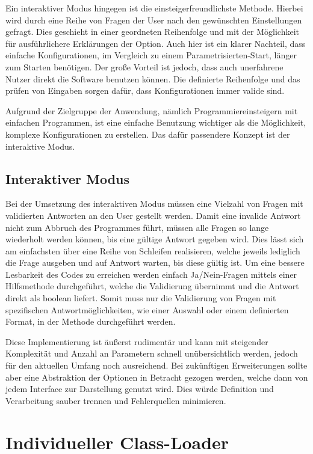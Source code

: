 Ein interaktiver Modus hingegen ist die einsteigerfreundlichste Methode. Hierbei wird durch eine Reihe von Fragen der User nach den gewünschten Einstellungen gefragt. Dies geschieht in einer geordneten Reihenfolge und mit der Möglichkeit für ausführlichere Erklärungen der Option. Auch hier ist ein klarer Nachteil, dass einfache Konfigurationen, im Vergleich zu einem Parametrisierten-Start, länger zum Starten benötigen. Der große Vorteil ist jedoch, dass auch unerfahrene Nutzer direkt die Software benutzen können. Die definierte Reihenfolge und das prüfen von Eingaben sorgen dafür, dass Konfigurationen immer valide sind.

Aufgrund der Zielgruppe der Anwendung, nämlich Programmiereinsteigern mit einfachen Programmen, ist eine einfache Benutzung wichtiger als die Möglichkeit, komplexe Konfigurationen zu erstellen. Das dafür passendere Konzept ist der interaktive Modus.

\subsection{Interaktiver Modus}

Bei der Umsetzung des interaktiven Modus müssen eine Vielzahl von Fragen mit validierten Antworten an den User gestellt werden. Damit eine invalide Antwort nicht zum Abbruch des Programmes führt, müssen alle Fragen so lange wiederholt werden können, bis eine gültige Antwort gegeben wird. Dies lässt sich am einfachsten über eine Reihe von Schleifen realisieren, welche jeweils lediglich die Frage ausgeben und auf Antwort warten, bis diese gültig ist. Um eine bessere Lesbarkeit des Codes zu erreichen werden einfach Ja/Nein-Fragen mittels einer Hilfsmethode durchgeführt, welche die Validierung übernimmt und die Antwort direkt als boolean liefert. Somit muss nur die Validierung von Fragen mit spezifischen Antwortmöglichkeiten, wie einer Auswahl oder einem definierten Format, in der Methode durchgeführt werden.

Diese Implementierung ist äußerst rudimentär und kann mit steigender Komplexität und Anzahl an Parametern schnell unübersichtlich werden, jedoch für den aktuellen Umfang noch ausreichend.
Bei zukünftigen Erweiterungen sollte aber eine Abstraktion der Optionen in Betracht gezogen werden, welche dann von jedem Interface zur Darstellung genutzt wird. Dies würde Definition und Verarbeitung sauber trennen und Fehlerquellen minimieren.

\section{Individueller Class-Loader}

